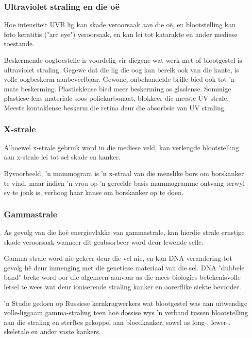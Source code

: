             \subsubsection*{Ultraviolet straling en die o\"e}
            \nopagebreak
        \label{m38779*id189581}Hoe intensiteit UVB lig kan skade veroorsaak aan die o\"e, en blootstelling kan foto keratitis ("arc eye") veroorsaak, en kan lei tot katarakte en ander mediese toestande. \par 
        \label{m38779*id189586}Beskermende oogtoestelle is voordelig vir diegene wat werk met of blootgestel is ultraviolet straling. Gegewe dat die lig die oog kan bereik ook van die kante, is volle oogbeskerm aanbeveelbaar. 
        \label{m38779*id189594} Gewone, onbehandelde brille bied ook tot 'n mate beskerming. Plastieklense bied meer beskerming as glaslense. Sommige plastiese lens materiale soos poliekarbonaat, blokkeer die meeste UV strale. Meeste kontaklense beskerm die retina deur die absorbsie van UV straling. \par 
      \label{m38779*uid22}
      \begin{minipage}{.5\textwidth}
            \subsubsection*{X-strale}
            \nopagebreak
        \label{m38779*id189613}Alhoewel x-strale gebruik word in die mediese veld, kan verlengde blootstelling aan x-strale lei tot sel skade en kanker. \par 
        \label{m38779*id189617} Byvoorbeeld, 'n mammogram is 'n x-straal van die menslike bors om borskanker te vind, maar indien 'n vrou op 'n gereelde basis mammogramme ontvang terwyl sy te jonk is, verhoog haar kanse om borskanker op te doen. \par 
      \label{m38779*uid23}
            \subsubsection*{Gammastrale}
            \nopagebreak
        \label{m38779*id189632}As gevolg van die ho\"e energievlakke van gammastrale, kan hierdie strale ernstige skade veroorsaak wanneer dit geabsorbeer word deur lewende selle. \par 
        \label{m38779*id189636}Gamma-strale word nie gekeer deur die vel nie, en kan DNA verandering tot gevolg h\^e deur inmenging met die genetiese materiaal van die sel. DNA "dubbele band" breke word oor die algemeen aanvaar as die mees biologies betekenisvolle letsel te wees wat deur ioniserende straling kanker en oorerflike siekte bevorder. \par 
        \label{m38779*id189642} 'n Studie gedoen op Russiese kernkragwerkers wat blootgestel was aan uitwendige volle-liggaam gamma-straling teen ho\"e dossise wys 'n verband tussen blootstelling aan die straling en sterftes gekoppel aan bloedkanker, sowel as long-, lewer-, skeletale en ander vaste kankers. \par 
      \label{m38779*eip-665}
\end{minipage}
